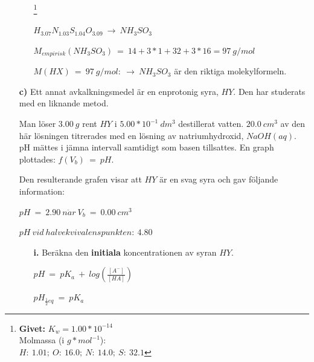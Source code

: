 \documentclass[12pt, letterpaper, twoside]{article}
\begin{document}
\begin{flushleft}
\begin{itemize}
\begin{itemize}
\footnote{
\textbf{Givet:} $ K_w=1.00*10^{-14} $\\
Molmassa (i $ g*mol^{-1} $):\\
$ H:\ 1.01;\ O:\ 16.0;\ N:\ 14.0;\ S:\ 32.1 $
}

\pagebreak
\hfill

$ H_{3.07}N_{1.03}S_{1.04}O_{3.09}\ \rightarrow\ NH_3SO_3 $

$ M_{empirisk}(NH_3SO_3)\ =\ 14+3*1+32+3*16 = 97\ g/mol $

$ M(HX)\ =\ 97\ g/mol:\ \rightarrow\ NH_3SO_3 $ är den riktiga molekylformeln.






\end{itemize}


\item[\textbf{c)}] Ett annat avkalkningsmedel är en enprotonig syra, $ HY $.
Den har studerats med en liknande metod.

Man löser $ 3.00\ g $ rent $ HY $ i $ 5.00*10^{-1}\ dm^3 $ destillerat vatten. $ 20.0\ cm^3 $ av den här
lösningen titrerades med en lösning av natriumhydroxid, $ NaOH(aq) $. pH mättes i jämna intervall samtidigt
som basen tillsattes. En graph plottades: $ f(V_b)\ =\ pH $.

Den resulterande grafen visar att $ HY $ är en svag syra och gav följande information:

$ pH\ =\ 2.90\ n\ddot{a}r\ V_b\ =\ 0.00\ cm^3 $

$ pH\ vid\ halvekvivalenspunkten:\ 4.80 $


\begin{itemize}
\item[\textbf{i.}] Beräkna den \textbf{initiala} koncentrationen av syran $ HY $.

$ pH\ =\ pK_a\ +\ log(\frac{[A^-]}{[HA]}) $

$ pH_{\frac{1}{2}eq}\ =\ pK_a $


\end{itemize}
\end{itemize}
\end{flushleft}
\end{document}
